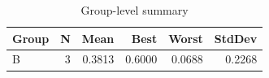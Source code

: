 \begin{table}[htbp]
\centering
\caption{Group-level summary}
\label{tab:group-summary}
\begin{tabular}{lrrrrr}
\toprule
\textbf{Group} & \textbf{N} & \textbf{Mean} & \textbf{Best} & \textbf{Worst} & \textbf{StdDev} \\
\midrule
B & 3 & 0.3813 & 0.6000 & 0.0688 & 0.2268 \\
\bottomrule
\end{tabular}
\end{table}